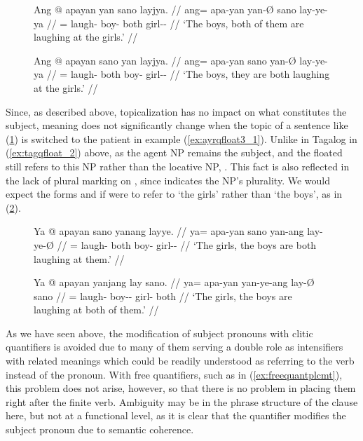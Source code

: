 \begin{figure}[t]
\pex\label{ex:ayrqfloat2}
\a\label{ex:ayrqfloat2_1}\begingl
	\gla Ang @ apayan yan sano layjya. //
	\glb ang= apa-yan yan-Ø sano lay-ye-ya //
	\glc \AgtT{}= laugh-\TplM{} boy-\Top{} both girl-\Pl{}-\Loc{} //
	\glft `The boys, both of them are laughing at the girls.' //
\endgl

\a\label{ex:ayrqfloat2_2}\begingl
	\gla Ang @ apayan sano yan layjya. //
	\glb ang= apa-yan sano yan-Ø lay-ye-ya //
	\glc \AgtT{}= laugh-\TplM{} both boy-\Top{} girl-\Pl{}-\Loc{} //
	\glft `The boys, they are both laughing at the girls.' //
\endgl
\xe
\end{figure}

Since, as described above, topicalization has no impact on what constitutes the
subject, meaning does not significantly change when the topic of a sentence
like (\ref{ex:ayrqfloat2_2}) is switched to the patient in example 
(\ref{ex:ayrqfloat3_1}). Unlike in Tagalog in (\ref{ex:tagqfloat_2}) above,
 as the agent NP remains the subject, and the
floated  still refers to this NP rather than the locative NP,
. This fact is also reflected in the lack of
plural marking on , since  indicates the
NP's plurality. We would expect the forms  and
 if  were to refer to `the girls' rather than
`the boys', as in (\ref{ex:ayrqfloat3_2}).

\begin{figure}[t]
\pex\label{ex:ayrqfloat3}
\a\label{ex:ayrqfloat3_1}\begingl
	\gla Ya @ apayan sano yanang layye. //
	\glb ya= apa-yan sano yan-ang lay-ye-Ø //
	\glc \LocT{}= laugh-\TplM{} both boy-\Aarg{} girl-\Pl{}-\Top{} //
	\glft `The girls, the boys are both laughing at them.' //
\endgl

\a\label{ex:ayrqfloat3_2}\begingl
	\gla Ya @ apayan yanjang lay sano. //
	\glb ya= apa-yan yan-ye-ang lay-Ø sano //
	\glc \LocT{}= laugh-\TplM{} boy-\Pl{}-\Aarg{} girl-\Top{} both //
	\glft `The girls, the boys are laughing at both of them.' //
\endgl
\xe
\end{figure}

As we have seen above, the modification of subject pronouns with clitic
quantifiers is avoided due to many of them serving a double role as
intensifiers with related meanings which could be readily understood as
referring to the verb instead of the pronoun. With free quantifiers, such as
 in (\ref{ex:freequantplcmt}), this problem does not
arise, however, so that there is no problem in placing them right after the
finite verb. Ambiguity may be in the phrase structure of the clause here, but
not at a functional level, as it is clear that the quantifier modifies the
subject pronoun due to semantic coherence.

